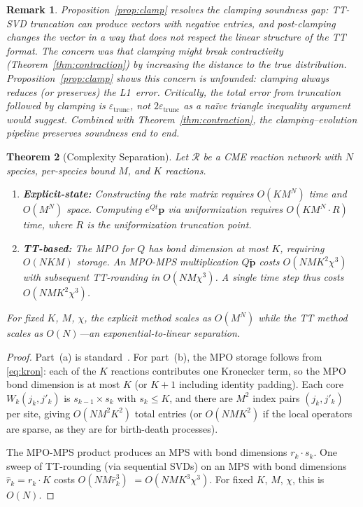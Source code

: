 \documentclass[11pt]{article}
\newtheorem{theorem}{Theorem}
\newtheorem{remark}[theorem]{Remark}
\newcommand{\eps}{\varepsilon}
\newcommand{\calR}{\mathcal{R}}
\begin{document}
\begin{remark}\label{rem:clamp-soundness}
Proposition~\ref{prop:clamp} resolves the \emph{clamping soundness
gap}: TT-SVD truncation can produce vectors with negative entries, and
post-clamping changes the vector in a way that does not respect the
linear structure of the TT format.
The concern was that clamping might break contractivity
(Theorem~\ref{thm:contraction}) by increasing the distance to the
true distribution.
Proposition~\ref{prop:clamp} shows this concern is unfounded:
clamping \emph{always reduces} (or preserves) the L1~error.
Critically, the total error from truncation followed by clamping is
$\eps_{\mathrm{trunc}}$, not $2\eps_{\mathrm{trunc}}$ as a na\"ive
triangle inequality argument would suggest.
Combined with Theorem~\ref{thm:contraction}, the clamping--evolution
pipeline preserves soundness end to end.
\end{remark}

\begin{theorem}[Complexity Separation]\label{thm:complexity}
Let $\calR$ be a CME reaction network with $N$ species,
per-species bound $M$, and $K$ reactions.
\begin{enumerate}[label=(\alph*)]
\item \textbf{Explicit-state:}
  Constructing the rate matrix requires $O(KM^N)$ time and $O(M^N)$
  space.
  Computing $e^{Qt}\mathbf{p}$ via uniformization requires
  $O(KM^N \cdot R)$ time, where $R$ is the uniformization truncation
  point.
\item \textbf{TT-based:}
  The MPO for $Q$ has bond dimension at most $K$, requiring
  $O(NKM)$ storage.
  An MPO-MPS multiplication $Q\tilde{\mathbf{p}}$ costs
  $O(NMK^2 \chi^3)$ with subsequent
  TT-rounding in $O(NM \chi^3)$.
  A single time step thus costs $O(NMK^2 \chi^3)$.
\end{enumerate}
For fixed $K$, $M$, $\chi$, the explicit method scales as $O(M^N)$
while the TT method scales as $O(N)$---an exponential-to-linear
separation.
\end{theorem}

\begin{proof}
Part~(a) is standard~\cite{kwiatkowska2011}.
For part~(b), the MPO storage follows from \eqref{eq:kron}:
each of the $K$ reactions contributes one Kronecker term, so the
MPO bond dimension is at most $K$ (or $K+1$ including identity padding).
Each core $W_k(j_k, j'_k)$ is $s_{k-1}\times s_k$ with
$s_k \leq K$, and there are $M^2$ index pairs $(j_k, j'_k)$ per
site, giving $O(NM^2 K^2)$ total entries (or $O(NMK^2)$ if the
local operators are sparse, as they are for birth-death processes).

The MPO-MPS product produces an MPS with bond dimensions
$r_k \cdot s_k$.
One sweep of TT-rounding (via sequential SVDs) on an MPS with
bond dimensions $\hat{r}_k = r_k \cdot K$ costs
$O(NM \hat{r}_k^3)$ $= O(NMK^3 \chi^3)$.
For fixed $K$, $M$, $\chi$, this is $O(N)$.
\end{proof}
\end{document}
